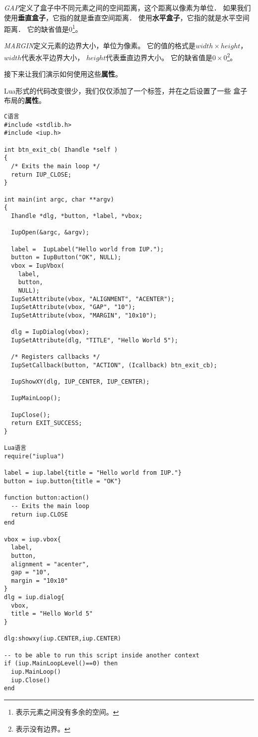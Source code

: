 \documentclass{ctexart}
\begin{document}
\emph{GAP}定义了盒子中不同元素之间的空间距离，这个距离以像素为单位．
如果我们使用\textbf{垂直盒子}，它指的就是垂直空间距离．
使用\textbf{水平盒子}，它指的就是水平空间距离．
它的缺省值是$0$\footnote{表示元素之间没有多余的空间。}。

\emph{MARGIN}定义元素的边界大小，单位为像素。
它的值的格式是$width×height$，$width$代表水平边界大小，
$height$代表垂直边界大小。
它的缺省值是$0×0$\footnote{表示没有边界。}。

接下来让我们演示如何使用这些\textbf{属性}。

Lua形式的代码改变很少，我们仅仅添加了一个标签，并在之后设置了一些
盒子布局的\textbf{属性}。

\lstset{language=C}
\begin{lstlisting}
C语言
#include <stdlib.h>
#include <iup.h>

int btn_exit_cb( Ihandle *self )
{
  /* Exits the main loop */
  return IUP_CLOSE;
}

int main(int argc, char **argv)
{
  Ihandle *dlg, *button, *label, *vbox;

  IupOpen(&argc, &argv);
  
  label =  IupLabel("Hello world from IUP.");
  button = IupButton("OK", NULL);
  vbox = IupVbox(
    label,
    button,
    NULL);
  IupSetAttribute(vbox, "ALIGNMENT", "ACENTER");
  IupSetAttribute(vbox, "GAP", "10");
  IupSetAttribute(vbox, "MARGIN", "10x10");
  
  dlg = IupDialog(vbox);
  IupSetAttribute(dlg, "TITLE", "Hello World 5");

  /* Registers callbacks */
  IupSetCallback(button, "ACTION", (Icallback) btn_exit_cb);

  IupShowXY(dlg, IUP_CENTER, IUP_CENTER);

  IupMainLoop();

  IupClose();
  return EXIT_SUCCESS;
}

Lua语言
require("iuplua")

label = iup.label{title = "Hello world from IUP."}
button = iup.button{title = "OK"}

function button:action()
  -- Exits the main loop
  return iup.CLOSE  
end

vbox = iup.vbox{
  label,
  button,
  alignment = "acenter",
  gap = "10",
  margin = "10x10"
}
dlg = iup.dialog{
  vbox,
  title = "Hello World 5"
}

dlg:showxy(iup.CENTER,iup.CENTER)

-- to be able to run this script inside another context
if (iup.MainLoopLevel()==0) then
  iup.MainLoop()
  iup.Close()
end
\end{lstlisting}
\end{document}

